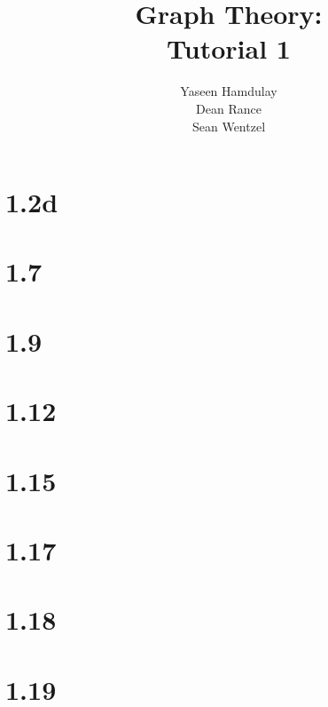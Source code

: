 \documentclass[12pt,a4paper]{article}
\title{{\bf Graph Theory:}\\
Tutorial 1}
\author{Yaseen Hamdulay \\
	Dean Rance \\
	Sean Wentzel}
\begin{document}
\maketitle
\section*{1.2d}

\section*{1.7}

\section*{1.9}

\section*{1.12}

\section*{1.15}

\section*{1.17}

\section*{1.18}

\section*{1.19}

\end{document}
